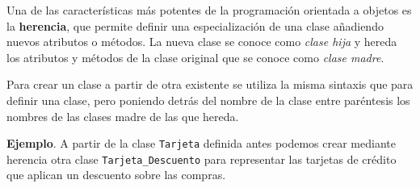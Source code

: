 \documentclass[
  spanish,
  a4paper,
]{scrreport}
\begin{document}
Una de las características más potentes de la programación orientada a
objetos es la \textbf{herencia}, que permite definir una especialización
de una clase añadiendo nuevos atributos o métodos. La nueva clase se
conoce como \emph{clase hija} y hereda los atributos y métodos de la
clase original que se conoce como \emph{clase madre}.

Para crear un clase a partir de otra existente se utiliza la misma
sintaxis que para definir una clase, pero poniendo detrás del nombre de
la clase entre paréntesis los nombres de las clases madre de las que
hereda.

\textbf{Ejemplo}. A partir de la clase \texttt{Tarjeta} definida antes
podemos crear mediante herencia otra clase \texttt{Tarjeta\_Descuento}
para representar las tarjetas de crédito que aplican un descuento sobre
las compras.
\end{document}
